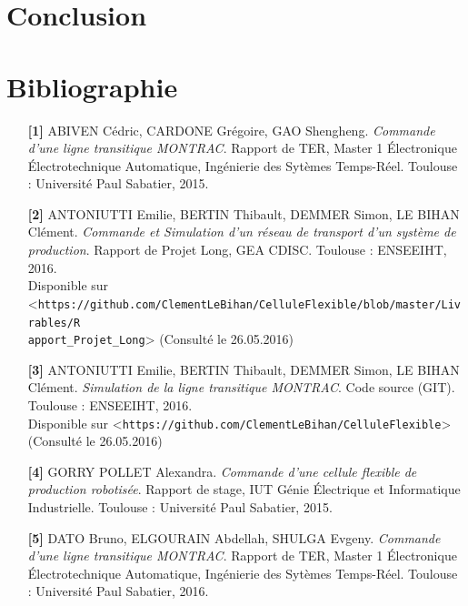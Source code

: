 \documentclass[a4paper,french, titlepage]{book}
\begin{document}
\newpage
{}
\chapter*{Conclusion}


\newpage
{}
\chapter*{Bibliographie}\label{biblio}



\begin{itemize}
\item[ \textbf{[1]}] ABIVEN Cédric, CARDONE Grégoire, GAO Shengheng. \textit{Commande d'une ligne transitique MONTRAC}. Rapport de TER, Master 1 Électronique Électrotechnique Automatique, Ingénierie des Sytèmes Temps-Réel. Toulouse : Université Paul Sabatier, 2015.
\item[ ]
\item[ \textbf{[2]} ] ANTONIUTTI Emilie, BERTIN Thibault, DEMMER Simon, LE BIHAN Clément. \textit{Commande et Simulation d'un réseau de transport d'un système de production}. Rapport de Projet Long, GEA CDISC. Toulouse : ENSEEIHT, 2016.\\
Disponible sur <\verb!https://github.com/ClementLeBihan/CelluleFlexible/blob/master/Livrables/R!\\
\verb!apport_Projet_Long!> (Consulté le 26.05.2016)
\item[ ]
\item[ \textbf{[3]} ] ANTONIUTTI Emilie, BERTIN Thibault, DEMMER Simon, LE BIHAN Clément. \textit{Simulation de la ligne transitique MONTRAC}. Code source (GIT). Toulouse : ENSEEIHT, 2016.\\
Disponible sur <\verb!https://github.com/ClementLeBihan/CelluleFlexible!> (Consulté le 26.05.2016)
\item[ ]
\item[ \textbf{[4]} ] GORRY POLLET Alexandra. \textit{Commande d’une cellule flexible de production robotisée}. Rapport de stage, IUT Génie Électrique et Informatique Industrielle. Toulouse : Université Paul Sabatier, 2015.
\item[ ]
\item[ \textbf{[5]}] DATO Bruno, ELGOURAIN Abdellah, SHULGA Evgeny. \textit{Commande d'une ligne transitique MONTRAC}. Rapport de TER, Master 1 Électronique Électrotechnique Automatique, Ingénierie des Sytèmes Temps-Réel. Toulouse : Université Paul Sabatier, 2016.

\end{itemize}
\end{document}
